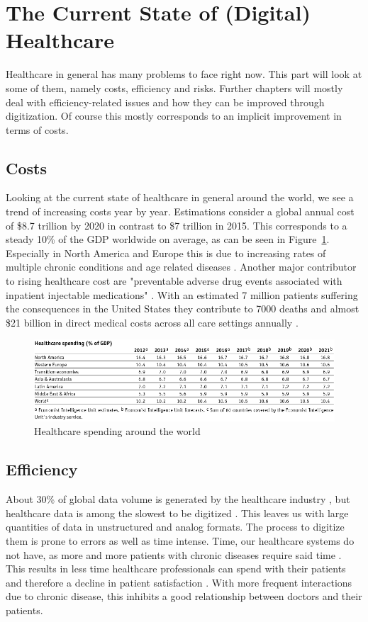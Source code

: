 \section{The Current State of (Digital) Healthcare}
Healthcare in general has many problems to face right now. This part will look at some of them, namely costs, efficiency and risks. Further chapters will mostly deal with efficiency-related issues and how they can be improved through digitization. Of course this mostly corresponds to an implicit improvement in terms of costs.
\subsection{Costs}
Looking at the current state of healthcare in general around the world, we see a trend of increasing costs year by year. Estimations consider a global annual cost of \$8.7 trillion by 2020 in contrast to \$7 trillion in 2015. This corresponds to a steady 10\% of the GDP worldwide on average, as can be seen in Figure~\ref{fig:GDPSpendingHC}.
Especially in North America and Europe this is due to increasing rates of multiple chronic conditions and age related diseases \cite{sambamoorthi2015multiple}. Another major contributor to rising healthcare cost are "preventable adverse drug events associated with inpatient injectable medications" \cite{lahue2012national}. With an estimated 7 million patients suffering the consequences in the United States they contribute to 7000 deaths and almost \$21 billion in direct medical costs across all care settings annually \cite{prevMedErrors}.
\begin{figure}[htpb]
    \centering
    \includegraphics[width=\linewidth]{media/Screenshot_2020-01-09_01_FULL_REPORT-World_healthcare_and.png}
    \caption{Healthcare spending around the world \cite{EIU2016}}%
    \label{fig:GDPSpendingHC}
\end{figure}
\subsection{Efficiency}
About 30\% of global data volume is generated by the healthcare industry \cite{gopal2019digital}, but healthcare data is among the slowest to be digitized \cite{industryDigitalization}. This leaves us with large quantities of data in unstructured and analog formats. The process to digitize them is prone to errors as well as time intense. Time, our healthcare systems do not have, as more and more patients with chronic diseases require said time \cite{ostbye2005there}. This results in less time healthcare professionals can spend with their patients \cite{fuchtbauer2013emergency} and therefore a decline in patient satisfaction \cite{gross1998patient}. With more frequent interactions due to chronic disease, this inhibits a good relationship between doctors and their patients.
